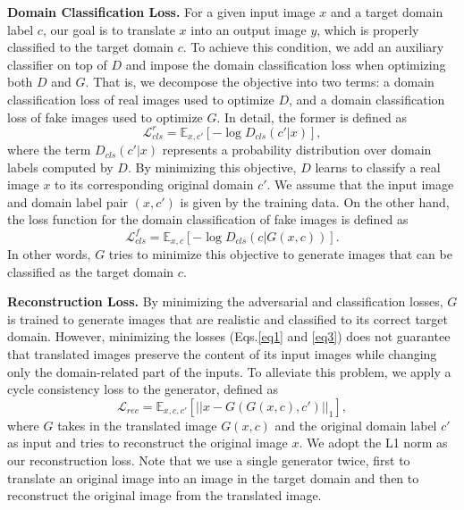 \documentclass[10pt,twocolumn,letterpaper]{article}
\begin{document}
\medskip

\noindent \textbf{Domain Classification Loss.} For a given input image $x$ and a target domain label $c$, our goal is to translate $x$ into an output image $y$, which is properly classified to the target domain $c$. To achieve this condition, we add an auxiliary classifier on top of $D$ and impose the domain classification loss when optimizing both $D$ and $G$. That is, we decompose the objective into two terms: a domain classification loss of real images used to optimize $D$, and a domain classification loss of fake images used to optimize $G$. In detail, the former is defined as
\begin{equation}
\mathcal{L}_{cls}^{r} = {\mathbb{E}}_{x, c'}[-\log{{D}_{cls}(c'|x)}],
\label{eq2}
\end{equation}
where the term ${D}_{cls}(c'|x)$ represents a probability distribution over domain labels computed by $D$. By minimizing this objective, $D$ learns to classify a real image $x$ to its corresponding original domain $c'$. We assume that the input image and domain label pair $(x, c')$ is given by the training data. On the other hand, the loss function for the domain classification of fake images is defined as
\begin{equation}
\mathcal{L}_{cls}^{f} ={\mathbb{E}}_{x, c}[-\log{{D}_{cls}(c|G(x, c))}].
\label{eq3}
\end{equation}
In other words, $G$ tries to minimize this objective to generate images that can be classified as the target domain $c$. %

\medskip

\noindent \textbf{Reconstruction Loss.} By minimizing the adversarial and classification losses, $G$ is trained to generate images that are realistic and classified to its correct target domain. However, minimizing the losses (Eqs.\thinspace\eqref{eq1} and \eqref{eq3}) does not guarantee that translated images preserve the content of its input images while changing only the domain-related part of the inputs. To alleviate this problem, we apply a cycle consistency loss \cite{kim2017learning, zhu2017unpaired} to the generator, defined as 
\begin{equation}
\mathcal{L}_{rec} = {\mathbb{E}}_{x, c, c'} [{||x - G(G(x, c), c')||}_{1} ],
\label{eq4}
\end{equation}
\noindent where $G$ takes in the translated image $G(x, c)$ and the original domain label $c'$ as input and tries to reconstruct the original image $x$. We adopt the L1 norm as our reconstruction loss. Note that we use a single generator twice, first to translate an original image into an image in the target domain and then to reconstruct the original image from the translated image. 
\end{document}
